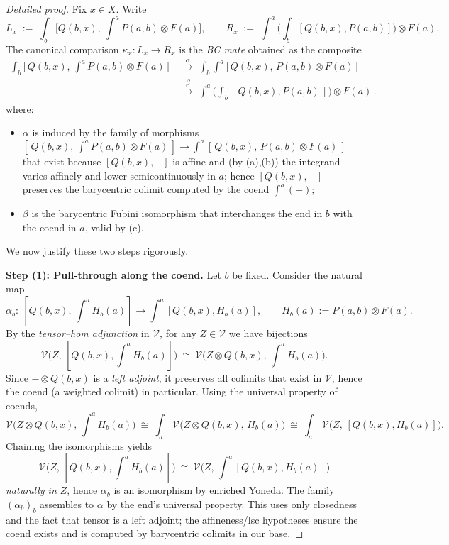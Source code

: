 \documentclass[11pt]{article}
\numberwithin{equation}{section}
\theoremstyle{upright}
\newcommand{\V}{\mathcal{V}}
\begin{document}
\begin{proof}[Detailed proof]
Fix $x\in X$. Write
\[
L_x\;:=\;\int_{b}\Big[Q(b,x),\,\int^{a}P(a,b)\otimes F(a)\Big],
\qquad
R_x\;:=\;\int^{a}\Big(\int_{b}[Q(b,x),P(a,b)]\Big)\otimes F(a).
\]
The canonical comparison $\kappa_x : L_x \to R_x$ is the \emph{BC mate}
obtained as the composite
\begin{equation}\label{eq:BC-mate}
\begin{aligned}
\int_{b}
  \Big[\,Q(b,x),\,
    \int^{a} P(a,b)\otimes F(a)\,\Big]
&\;\xrightarrow{\ \alpha\ }\;
  \int_{b}\int^{a}
    \Big[\,Q(b,x),\,P(a,b)\otimes F(a)\,\Big]
\\[0.4em]
&\;\xrightarrow{\ \beta\ }\;
  \int^{a}
    \Big(\int_{b}[\,Q(b,x),P(a,b)\,]\Big)\otimes F(a)\,.
\end{aligned}
\end{equation}
where:
\begin{itemize}[leftmargin=*]
\item $\alpha$ is induced by the family of morphisms
\(
[\,Q(b,x),\,\int^{a}P(a,b)\otimes F(a)\,]\to \int^{a}[\,Q(b,x),\,P(a,b)\otimes F(a)\,]
\)
that exist because $[Q(b,x),-]$ is affine and (by (a),(b)) the integrand varies affinely and lower semicontinuously in $a$; hence $[Q(b,x),-]$ preserves the barycentric colimit computed by the coend $\int^a(-)$;
\item $\beta$ is the barycentric Fubini isomorphism that interchanges the end in $b$ with the coend in $a$, valid by (c).
\end{itemize}
We now justify these two steps rigorously.

\smallskip
\noindent\textbf{Step (1): Pull-through along the coend.}
Let $b$ be fixed. Consider the natural map
\[
\alpha_b:\ [Q(b,x),\,\textstyle\int^{a}H_b(a)]\longrightarrow \int^{a}[Q(b,x),H_b(a)],
\qquad H_b(a):=P(a,b)\otimes F(a).
\]
By the \emph{tensor–hom adjunction} in $\V$, for any $Z\in\V$ we have bijections
\[
\V\big(Z,\,[Q(b,x),\textstyle\int^{a}H_b(a)]\big)
\ \cong\
\V\big(Z\otimes Q(b,x),\,\textstyle\int^{a}H_b(a)\big).
\]
Since $-\otimes Q(b,x)$ is a \emph{left adjoint}, it preserves all colimits that exist in $\V$, hence the coend (a weighted colimit) in particular. Using the universal property of coends,
\[
\V\big(Z\otimes Q(b,x),\,\textstyle\int^{a}H_b(a)\big)
\ \cong\
\int_{a}\,\V\big(Z\otimes Q(b,x),\,H_b(a)\big)
\ \cong\
\int_{a}\,\V\big(Z,\,[Q(b,x),H_b(a)]\big).
\]
Chaining the isomorphisms yields
\[
\V\big(Z,\,[Q(b,x),\textstyle\int^{a}H_b(a)]\big)\ \cong\ \V\big(Z,\,\textstyle\int^{a}[Q(b,x),H_b(a)]\big)
\]
\emph{naturally in $Z$}, hence $\alpha_b$ is an isomorphism by enriched Yoneda. The family $(\alpha_b)_b$ assembles to $\alpha$ by the end’s universal property. This uses only closedness and the fact that tensor is a left adjoint; the affineness/lsc hypotheses ensure the coend exists and is computed by barycentric colimits in our base.


\end{proof}
\end{document}
